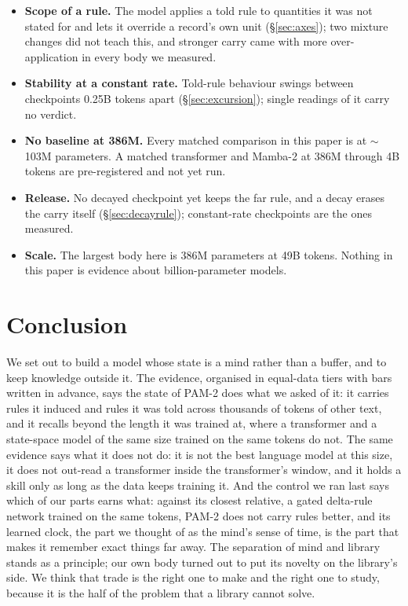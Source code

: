 \documentclass[11pt]{article}
\newcommand{\arch}{PAM-2}
\newcommand{\mamba}{Mamba-2}
\begin{document}
\begin{itemize}[leftmargin=1.4em,itemsep=1pt]
\item \textbf{Scope of a rule.} The model applies a told rule to quantities it was not stated for and lets it override a record's own unit (\S\ref{sec:axes}); two mixture changes did not teach this, and stronger carry came with more over-application in every body we measured.
\item \textbf{Stability at a constant rate.} Told-rule behaviour swings between checkpoints 0.25B tokens apart (\S\ref{sec:excursion}); single readings of it carry no verdict.
\item \textbf{No baseline at 386M.} Every matched comparison in this paper is at $\sim$103M parameters. A matched transformer and \mamba{} at 386M through 4B tokens are pre-registered and not yet run.
\item \textbf{Release.} No decayed checkpoint yet keeps the far rule, and a decay erases the carry itself (\S\ref{sec:decayrule}); constant-rate checkpoints are the ones measured.
\item \textbf{Scale.} The largest body here is 386M parameters at 49B tokens. Nothing in this paper is evidence about billion-parameter models.
\end{itemize}

\section{Conclusion}
We set out to build a model whose state is a mind rather than a buffer, and to keep knowledge outside it. The evidence, organised in equal-data tiers with bars written in advance, says the state of \arch{} does what we asked of it: it carries rules it induced and rules it was told across thousands of tokens of other text, and it recalls beyond the length it was trained at, where a transformer and a state-space model of the same size trained on the same tokens do not. The same evidence says what it does not do: it is not the best language model at this size, it does not out-read a transformer inside the transformer's window, and it holds a skill only as long as the data keeps training it. And the control we ran last says which of our parts earns what: against its closest relative, a gated delta-rule network trained on the same tokens, \arch{} does not carry rules better, and its learned clock, the part we thought of as the mind's sense of time, is the part that makes it remember exact things far away. The separation of mind and library stands as a principle; our own body turned out to put its novelty on the library's side. We think that trade is the right one to make and the right one to study, because it is the half of the problem that a library cannot solve.
\end{document}
